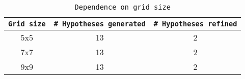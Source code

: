{
\begin{center}
    \begin{table}[h]
    \centering
    \begin{tabular}{ |c|c|c| } 
        \hline
        \texttt{Grid size} & \texttt{\# Hypotheses generated} & \texttt{\# Hypotheses refined} \\ \hline
        5x5 & 13 & 2 \\ 
        7x7 & 13 & 2 \\ 
        9x9 & 13 & 2 \\ 
        \hline
    \end{tabular}
    \caption{\label{tab:move_grid}\texttt{Dependence on grid size} }
    \end{table}
\end{center}
}

